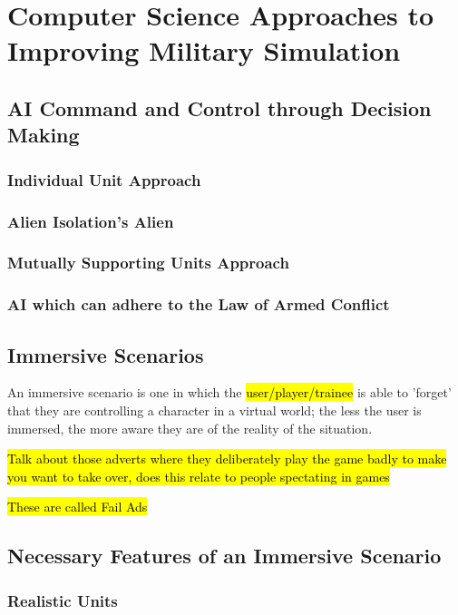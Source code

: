 \documentclass{article}
\begin{document}
\section{Computer Science Approaches to Improving Military Simulation}

\subsection{AI Command and Control through Decision Making}

\subsubsection{Individual Unit Approach}

\subsubsection{Alien Isolation's Alien}

\subsubsection{Mutually Supporting Units Approach}

\subsubsection{AI which can adhere to the Law of Armed Conflict}

\subsection{Immersive Scenarios}

An immersive scenario is one in which the \hl{user/player/trainee} is able to 'forget' that they are controlling a character in a virtual world; the less the user is immersed, the more aware they are of the reality of the situation.

\hl{Talk about those adverts where they deliberately play the game badly to make you want to take over, does this relate to people spectating in games}

\hl{These are called Fail Ads} 

\subsection{Necessary Features of an Immersive Scenario}

\subsubsection{Realistic Units}
\end{document}
